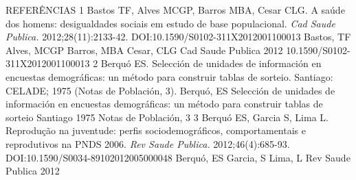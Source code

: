 \documentclass{article}
\begin{document}
REFERÊNCIAS%
1%
Bastos TF, Alves MCGP, Barros MBA, Cesar CLG. A saúde dos homens: desigualdades sociais em estudo de base populacional. %
\textit{Cad Saude Publica.}
 2012;28(11):2133-42. DOI:10.1590/S0102-311X2012001100013%
Bastos, %
TF
Alves, %
MCGP
Barros, %
MBA
Cesar, %
CLG
Cad Saude Publica%
2012%
10.1590/S0102-311X2012001100013%
2%
Berquó ES. Selección de unidades de información en encuestas demográficas: un método para construir tablas de sorteio. Santiago: CELADE; 1975 (Notas de Población, 3).%
Berquó, %
ES
Selección de unidades de información en encuestas demográficas: un método para construir tablas de sorteio%
Santiago%
1975%
Notas de Población, 3%
3%
Berquó ES, Garcia S, Lima L. Reprodução na juventude: perfis sociodemográficos, comportamentais e reprodutivos na PNDS 2006. %
\textit{Rev Saude Publica. }
2012;46(4):685-93. DOI:10.1590/S0034-89102012005000048%
Berquó, %
ES
Garcia, %
S
Lima, %
L
Rev Saude Publica%
2012%
\end{document}
